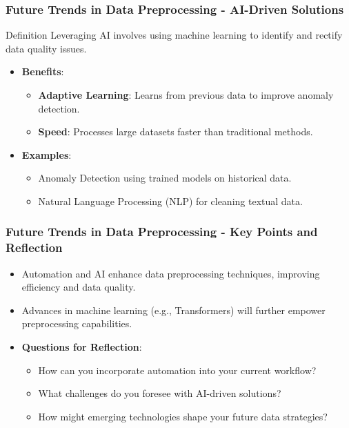 \documentclass[aspectratio=169]{beamer}
\begin{document}
\begin{frame}[fragile]
    \frametitle{Future Trends in Data Preprocessing - AI-Driven Solutions}
    \begin{block}{Definition}
        Leveraging AI involves using machine learning to identify and rectify data quality issues.
    \end{block}
    \begin{itemize}
        \item \textbf{Benefits}:
        \begin{itemize}
            \item \textbf{Adaptive Learning}: Learns from previous data to improve anomaly detection.
            \item \textbf{Speed}: Processes large datasets faster than traditional methods.
        \end{itemize}
        \item \textbf{Examples}:
        \begin{itemize}
            \item Anomaly Detection using trained models on historical data.
            \item Natural Language Processing (NLP) for cleaning textual data.
        \end{itemize}
    \end{itemize}
\end{frame}

\begin{frame}[fragile]
    \frametitle{Future Trends in Data Preprocessing - Key Points and Reflection}
    \begin{itemize}
        \item Automation and AI enhance data preprocessing techniques, improving efficiency and data quality.
        \item Advances in machine learning (e.g., Transformers) will further empower preprocessing capabilities.
        \item \textbf{Questions for Reflection}:
        \begin{itemize}
            \item How can you incorporate automation into your current workflow?
            \item What challenges do you foresee with AI-driven solutions?
            \item How might emerging technologies shape your future data strategies?
        \end{itemize}
    \end{itemize}
\end{frame}
\end{document}
